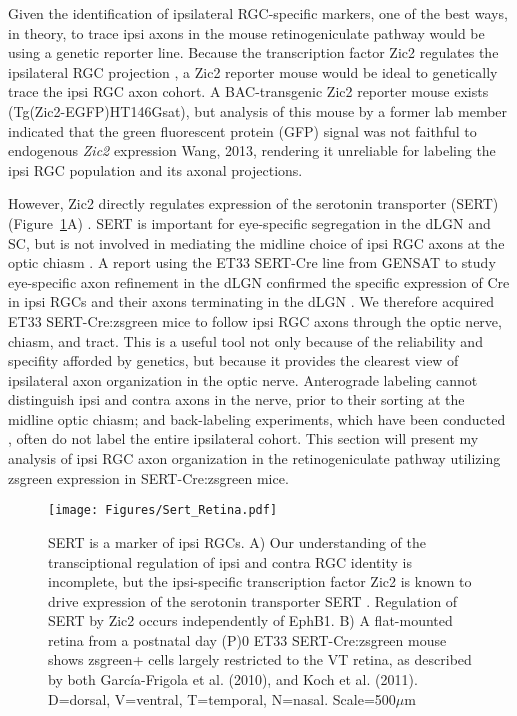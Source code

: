 Given the identification of ipsilateral RGC-specific markers, one of the best ways, in theory, to trace ipsi axons in the mouse retinogeniculate pathway would be using a genetic reporter line.
Because the transcription factor Zic2 regulates the ipsilateral RGC projection \cite{herrera2003zic2,williams2003ephrin}, a Zic2 reporter mouse would be ideal to genetically trace the ipsi RGC axon cohort.
A BAC-transgenic Zic2 reporter mouse exists (Tg(Zic2-EGFP)HT146Gsat), but analysis of this mouse by a former lab member indicated that the green fluorescent protein (GFP) signal was not faithful to endogenous \emph{Zic2} expression {Wang, 2013}, rendering it unreliable for labeling the ipsi RGC population and its axonal projections.

However, Zic2 directly regulates expression of the serotonin transporter (SERT) (Figure~\ref{Figures/Sert_Retina}A) \cite{garcia2010zic2}.
SERT is important for eye-specific segregation in the dLGN and SC, but is not involved in mediating the midline choice of ipsi RGC axons at the optic chiasm \cite{salichon2001excessive,upton1999excess,garcia2010zic2}.
A report using the ET33 SERT-Cre line from GENSAT to study eye-specific axon refinement in the dLGN confirmed the specific expression of Cre in ipsi RGCs and their axons terminating in the dLGN \cite{koch2011pathway}.
We therefore acquired ET33 SERT-Cre:zsgreen mice to follow ipsi RGC axons through the optic nerve, chiasm, and tract.
This is a useful tool not only because of the reliability and specifity afforded by genetics, but because it provides the clearest view of ipsilateral axon organization in the optic nerve.
Anterograde labeling cannot distinguish ipsi and contra axons in the nerve, prior to their sorting at the midline optic chiasm; and back-labeling experiments, which have been conducted \cite{colello1990early}, often do not label the entire ipsilateral cohort.
This section will present my analysis of ipsi RGC axon organization in the retinogeniculate pathway utilizing zsgreen expression in SERT-Cre:zsgreen mice.

\begin{figure}[hbtp]
	\begin{center}
		\texttt{[image: Figures/Sert\_Retina.pdf]}
		\caption[SERT is a marker of ipsi RGCs.]
		{
		SERT is a marker of ipsi RGCs. 
		A) Our understanding of the transciptional regulation of ipsi and contra RGC identity is incomplete, but the ipsi-specific transcription factor Zic2 is known to drive expression of the serotonin transporter SERT \cite{garcia2010zic2}.
		Regulation of SERT by Zic2 occurs independently of EphB1.
		B) A flat-mounted retina from a postnatal day (P)0 ET33 SERT-Cre:zsgreen mouse shows zsgreen+ cells largely restricted to the VT retina, as described by both Garc\'ia-Frigola et al. (2010), and Koch et al. (2011). 
		D=dorsal, V=ventral, T=temporal, N=nasal. 
		Scale=500$\mu$m
		}
		\label{Figures/Sert_Retina}
	\end{center}
\end{figure}

